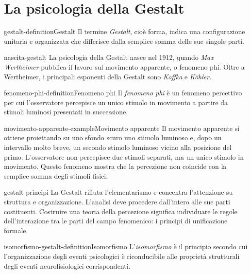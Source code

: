 \documentclass[preview]{standalone}
\begin{document}
\genpage

\section{La psicologia della Gestalt}

\begin{snippetdefinition}{gestalt-definition}{Gestalt}
    Il termine \emph{Gestalt}, cioè forma, indica una configurazione unitaria
    e organizzata che differisce dalla semplice somma delle sue singole parti.
\end{snippetdefinition}

\begin{snippet}{nascita-gestalt}
    La psicologia della Gestalt nasce nel 1912, quando \emph{Max Wertheimer}
    pubblica il lavoro sul movimento apparente, o fenomeno phi. Oltre a
    Wertheimer, i principali esponenti della Gestalt sono \emph{Koffka} e
    \emph{Köhler}.
\end{snippet}

\begin{snippetdefinition}{fenomeno-phi-definition}{Fenomeno phi}
    Il \emph{fenomeno phi} è un fenomeno percettivo per cui l'osservatore
    percepisce un unico stimolo in movimento a partire da stimoli luminosi
    presentati in successione.
\end{snippetdefinition}

\begin{snippetexample}{movimento-apparente-example}{Movimento apparente}
    Il movimento apparente si ottiene proiettando su uno sfondo scuro uno
    stimolo luminoso e, dopo un intervallo molto breve, un secondo stimolo
    luminoso vicino alla posizione del primo. L'osservatore non percepisce due
    stimoli separati, ma un unico stimolo in movimento. Questo fenomeno mostra
    che la percezione non coincide con la semplice somma degli stimoli fisici.
\end{snippetexample}

\begin{snippet}{gestalt-principi}
    La Gestalt rifiuta l'elementarismo e concentra l'attenzione su struttura e
    organizzazione. L'analisi deve procedere dall'intero alle sue parti
    costituenti. Costruire una teoria della percezione significa individuare le
    regole dell'interazione tra le parti del campo fenomenico: i principi di
    unificazione formale.
\end{snippet}

\begin{snippetdefinition}{isomorfismo-gestalt-definition}{Isomorfismo}
    L'\emph{isomorfismo} è il principio secondo cui l'organizzazione degli
    eventi psicologici è riconducibile alle proprietà strutturali degli eventi
    neurofisiologici corrispondenti.
\end{snippetdefinition}
\end{document}
